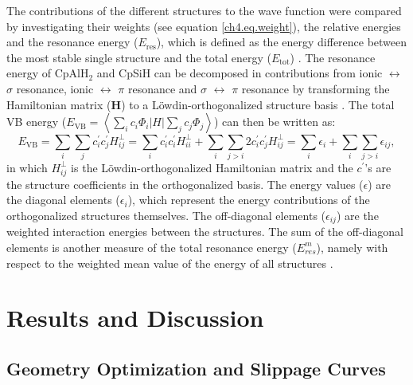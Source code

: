 The contributions of the different structures to the wave function were compared by investigating their weights (see equation \ref{ch4.eq.weight}), the relative energies and the resonance energy ($E_\mathrm{res}$), which is defined as the energy difference between the most stable single structure and the total energy ($E_\mathrm{tot}$) \cite{pauling}. The resonance energy of CpAlH$_2$ and CpSiH can be decomposed in contributions from ionic $\leftrightarrow$ $\sigma$ resonance, ionic $\leftrightarrow$ $\pi$ resonance and $\sigma$ $\leftrightarrow$ $\pi$ resonance by transforming the Hamiltonian matrix ($\mathbf{H}$) to a L\"owdin-orthogonalized \cite{lowdin} structure basis \cite{havenith}. The total VB energy ($E_\mathrm{VB}  = \left < \sum_{i} c_{i}\Phi{_i} | H | \sum_{j} c_{j}\Phi{_j} \right >$) can then be written as:
\begin{equation}
E_\mathrm{VB} = \sum_{i}\sum_{j}c^\prime_{i}c^\prime_{j}H_{ij}^{\bot}=\sum_{i}c^\prime_{i}c^\prime_{i}H_{ii}^{\bot}+\sum_{i}\sum_{j>i}2c^\prime_{i}c^\prime_{j}H_{ij}^{\bot}=\sum_{i}\epsilon_{i}+\sum_{i}\sum_{j>i}\epsilon_{ij},
\label{ch4.eq.energ}
\end{equation}
in which $H_{ij}^{\bot}$ is the L\"owdin-orthogonalized Hamiltonian matrix and the $c^\prime$'s are the structure coefficients in the orthogonalized basis. The energy values ($\epsilon$) are the diagonal elements ($\epsilon_{i}$), which represent the energy contributions of the orthogonalized structures themselves. The off-diagonal elements  ($\epsilon_{ij}$) are the weighted interaction energies between the structures. The sum of the off-diagonal elements is another measure of the total resonance energy ($E^{m}_{res}$), namely with respect to the weighted mean value of the energy of all structures \cite{havenith}.

\section{Results and Discussion}

\subsection{\label{ch4.sec.slippage}Geometry Optimization and Slippage Curves}

